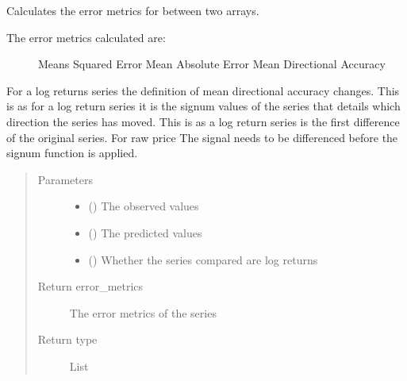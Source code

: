 \documentclass[letterpaper,10pt,english]{sphinxmanual}
\begin{document}

\begin{fulllineitems}
\label{\detokenize{index:Forecaster.eval_inspect.evaluate}}
Calculates the error metrics for between two arrays.
\begin{description}
\item[{The error metrics calculated are:}] \leavevmode
Means Squared Error
Mean Absolute Error
Mean Directional Accuracy

\end{description}

For a log returns series the definition of mean directional accuracy
changes. This is as for a log return series it is the signum values of the
series that details which direction the series has moved. This is as a log
return series is the first difference of the original series. For raw price
The signal needs to be differenced before the signum function is applied.
\begin{quote}\begin{description}
\item[{Parameters}] \leavevmode\begin{itemize}
\item {} 
 () \textendash{} The observed values

\item {} 
 () \textendash{} The predicted values

\item {} 
 () \textendash{} Whether the series compared are log returns

\end{itemize}

\item[{Return error\_metrics}] \leavevmode
The error metrics of the series

\item[{Return type}] \leavevmode
List

\end{description}\end{quote}

\end{fulllineitems}
\end{document}
